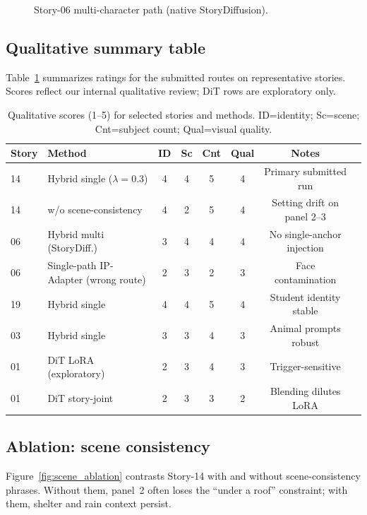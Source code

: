 \begin{figure}[!t]
  \centering
  \caption{Story-06 multi-character path (native StoryDiffusion).}
  \label{fig:story06}
\end{figure}

\subsection{Qualitative summary table}
Table~\ref{tab:results} summarizes ratings for the submitted routes on representative stories.
Scores reflect our internal qualitative review; DiT rows are exploratory only.

\begin{table}[!t]
  \centering
  \small
  \caption{Qualitative scores (1--5) for selected stories and methods. ID=identity; Sc=scene; Cnt=subject count; Qual=visual quality.}
  \label{tab:results}
  \begin{tabular}{llccccc p{}}
    \toprule
    Story & Method & ID & Sc & Cnt & Qual & Notes \\
    \midrule
    14 & Hybrid single ($\lambda{=}0.3$) & 4 & 4 & 5 & 4 & Primary submitted run \\
    14 & w/o scene-consistency & 4 & 2 & 5 & 4 & Setting drift on panel 2--3 \\
    06 & Hybrid multi (StoryDiff.) & 3 & 4 & 4 & 4 & No single-anchor injection \\
    06 & Single-path IP-Adapter (wrong route) & 2 & 3 & 2 & 3 & Face contamination \\
    19 & Hybrid single & 4 & 4 & 5 & 4 & Student identity stable \\
    03 & Hybrid single & 3 & 3 & 4 & 3 & Animal prompts robust \\
    01 & DiT LoRA (exploratory) & 2 & 3 & 4 & 3 & Trigger-sensitive \\
    01 & DiT story-joint & 2 & 3 & 3 & 2 & Blending dilutes LoRA \\
    \bottomrule
  \end{tabular}
\end{table}

\subsection{Ablation: scene consistency}
Figure~\ref{fig:scene_ablation} contrasts Story-14 with and without scene-consistency phrases.
Without them, panel~2 often loses the ``under a roof'' constraint; with them, shelter and rain context persist.

